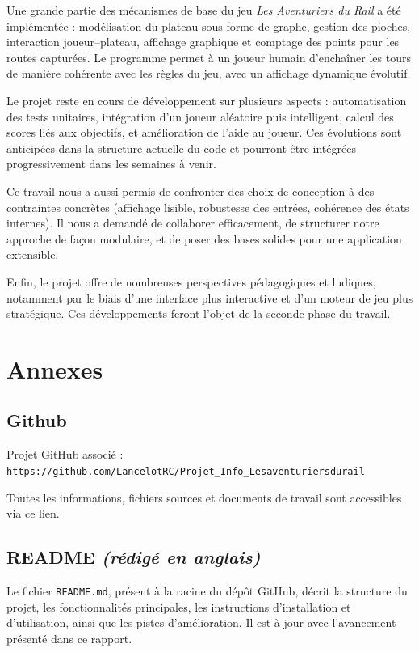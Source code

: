 \documentclass[a4paper,12pt]{report}
\begin{document}
Une grande partie des mécanismes de base du jeu \textit{Les Aventuriers du Rail} a été implémentée : modélisation du
plateau sous forme de graphe, gestion des pioches, interaction joueur–plateau, affichage graphique et comptage des
points pour les routes capturées. Le programme permet à un joueur humain d’enchaîner les tours de manière cohérente
avec les règles du jeu, avec un affichage dynamique évolutif.

Le projet reste en cours de développement sur plusieurs aspects : automatisation des tests unitaires, intégration d’un
joueur aléatoire puis intelligent, calcul des scores liés aux objectifs, et amélioration de l’aide au joueur.
Ces évolutions sont anticipées dans la structure actuelle du code et pourront être intégrées progressivement dans les
semaines à venir.

Ce travail nous a aussi permis de confronter des choix de conception à des contraintes concrètes (affichage lisible,
robustesse des entrées, cohérence des états internes). Il nous a demandé de collaborer efficacement, de structurer
notre approche de façon modulaire, et de poser des bases solides pour une application extensible.

Enfin, le projet offre de nombreuses perspectives pédagogiques et ludiques, notamment par le biais d’une interface plus
interactive et d’un moteur de jeu plus stratégique. Ces développements feront l’objet de la seconde phase du travail.

\appendix

\chapter{Annexes}


\section*{Github}
Projet GitHub associé : \texttt{https://github.com/LancelotRC/Projet\_Info\_Lesaventuriersdurail}

Toutes les informations, fichiers sources et documents de travail sont accessibles via ce lien.

\section*{README \textit{(rédigé en anglais)}}

Le fichier \texttt{README.md}, présent à la racine du dépôt GitHub, décrit la structure du projet, les fonctionnalités
principales, les instructions d’installation et d’utilisation, ainsi que les pistes d’amélioration.
Il est à jour avec l’avancement présenté dans ce rapport.
\end{document}
